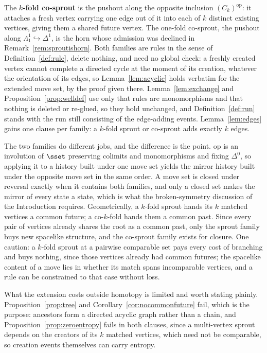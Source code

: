 \begin{definition}[Co-sprout]
\label{def:cosprout}
The \textbf{$k$-fold co-sprout} is the pushout along the opposite inclusion $(C_k)^{\mathrm{op}}$: it attaches a fresh vertex carrying one edge out of it into each of $k$ distinct existing vertices, giving them a shared future vertex.
The one-fold co-sprout, the pushout along $\Lambda^1_1 \hookrightarrow \Delta^1$, is the horn whose admission was declined in Remark~\ref{rem:sproutishorn}.
Both families are rules in the sense of Definition~\ref{def:rule}, delete nothing, and need no global check: a freshly created vertex cannot complete a directed cycle at the moment of its creation, whatever the orientation of its edges, so Lemma~\ref{lem:acyclic} holds verbatim for the extended move set, by the proof given there.
Lemma~\ref{lem:exchange} and Proposition~\ref{prop:welldef} use only that rules are monomorphisms and that nothing is deleted or re-glued, so they hold unchanged, and Definition~\ref{def:run} stands with the run still consisting of the edge-adding events.
Lemma~\ref{lem:edges} gains one clause per family: a $k$-fold sprout or co-sprout adds exactly $k$ edges.
\end{definition}

The two families do different jobs, and the difference is the point.
$\mathrm{op}$ is an involution of $\sset$ preserving colimits and monomorphisms and fixing $\Delta^0$, so applying it to a history built under one move set yields the mirror history built under the opposite move set in the same order.
A move set is closed under reversal exactly when it contains both families, and only a closed set makes the mirror of every state a state, which is what the broken-symmetry discussion of the Introduction requires.
Geometrically, a $k$-fold sprout hands its $k$ matched vertices a common future; a co-$k$-fold hands them a common past.
Since every pair of vertices already shares the root as a common past, only the sprout family buys new spacelike structure, and the co-sprout family exists for closure.
One caution: a $k$-fold sprout at a pairwise comparable set pays every cost of branching and buys nothing, since those vertices already had common futures; the spacelike content of a move lies in whether its match spans incomparable vertices, and a rule can be constrained to that case without loss.

What the extension costs outside homotopy is limited and worth stating plainly.
Proposition~\ref{prop:tree} and Corollary~\ref{cor:nocommonfuture} fail, which is the purpose: ancestors form a directed acyclic graph rather than a chain, and Proposition~\ref{prop:zeroentropy} fails in both clauses, since a multi-vertex sprout depends on the creators of its $k$ matched vertices, which need not be comparable, so creation events themselves can carry entropy.

